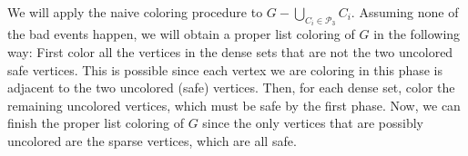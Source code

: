 \documentclass[12pt]{article}
\newtheorem{claim}[theorem]{Claim}
\theoremstyle{definition}
\begin{document}
We will apply the naive coloring procedure to $G-\bigcup_{C_i\in \mathcal{P}_3}C_i$. Assuming none of the bad events happen, we will obtain a proper list coloring of $G$ in the following way: 
First color all the vertices in the dense sets that are not the two uncolored safe vertices. 
This is possible since each vertex we are coloring in this phase is adjacent to the two uncolored (safe) vertices.
Then, for each dense set, color the remaining uncolored vertices, which must be safe by the first phase.
Now, we can finish the proper list coloring of $G$ since the only vertices that are possibly uncolored are the sparse vertices, which are all safe. 

%
%
%
%
\end{document}
